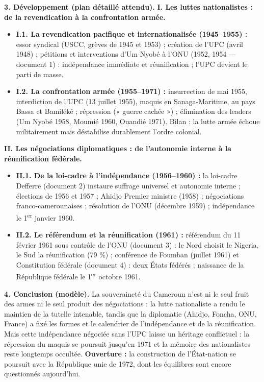 \documentclass[11pt]{article}
\begin{document}
\begin{corrige}
\textbf{3. Développement (plan détaillé attendu).}
\textbf{I. Les luttes nationalistes : de la revendication à la confrontation armée.}
\begin{itemize}
\item \textbf{I.1. La revendication pacifique et internationalisée (1945--1955) :} essor syndical (USCC, grèves de 1945 et 1953) ; création de l'UPC (avril 1948) ; pétitions et interventions d'Um Nyobé à l'ONU (1952, 1954 — document 1) : indépendance immédiate et réunification ; l'UPC devient le parti de masse.
\item \textbf{I.2. La confrontation armée (1955--1971) :} insurrection de mai 1955, interdiction de l'UPC (13 juillet 1955), maquis en Sanaga-Maritime, au pays Bassa et Bamiléké ; répression (« guerre cachée ») ; élimination des leaders (Um Nyobé 1958, Moumié 1960, Ouandié 1971). Bilan : la lutte armée échoue militairement mais déstabilise durablement l'ordre colonial.
\end{itemize}
\textbf{II. Les négociations diplomatiques : de l'autonomie interne à la réunification fédérale.}
\begin{itemize}
\item \textbf{II.1. De la loi-cadre à l'indépendance (1956--1960) :} la loi-cadre Defferre (document 2) instaure suffrage universel et autonomie interne ; élections de 1956 et 1957 ; Ahidjo Premier ministre (1958) ; négociations franco-camerounaises ; résolution de l'ONU (décembre 1959) ; indépendance le 1\textsuperscript{er} janvier 1960.
\item \textbf{II.2. Le référendum et la réunification (1961) :} référendum du 11 février 1961 sous contrôle de l'ONU (document 3) : le Nord choisit le Nigeria, le Sud la réunification (79 \%) ; conférence de Foumban (juillet 1961) et Constitution fédérale (document 4) : deux États fédérés ; naissance de la République fédérale le 1\textsuperscript{er} octobre 1961.
\end{itemize}

\textbf{4. Conclusion (modèle).} La souveraineté du Cameroun n'est ni le seul fruit des armes ni le seul produit des négociations : la lutte nationaliste a rendu le maintien de la tutelle intenable, tandis que la diplomatie (Ahidjo, Foncha, ONU, France) a fixé les formes et le calendrier de l'indépendance et de la réunification. Mais cette indépendance négociée sans l'UPC laisse un héritage conflictuel : la répression du maquis se poursuit jusqu'en 1971 et la mémoire des nationalistes reste longtemps occultée. \textbf{Ouverture :} la construction de l'État-nation se poursuit avec la République unie de 1972, dont les équilibres sont encore questionnés aujourd'hui.


\end{corrige}
\end{document}

